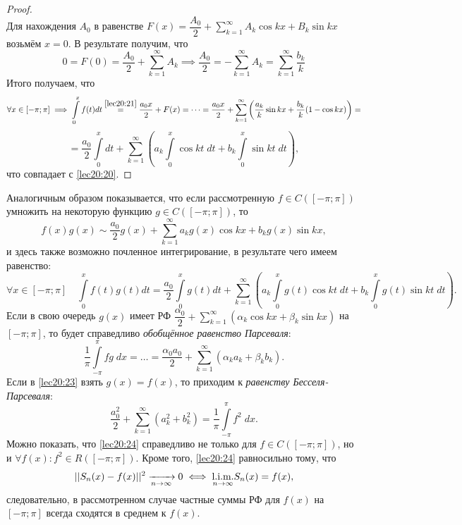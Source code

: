 \documentclass[../../main.tex]{subfiles}
\begin{document}
\begin{proof}
\[		\]
		Для нахождения $ A_0 $ в равенстве $ F(x) =
		\dfrac{A_0}{2} + \sum\limits_{k = 1}^\infty A_k\cos kx +
		B_k\sin kx $ возьмём $ x = 0 $. В результате получим, что
		\[
		0 = F(0) = \dfrac{A_0}{2} + \sum\limits_{k = 1}^\infty A_k \implies
		\dfrac{A_0}{2} = -\sum\limits_{k = 1}^\infty A_k = 
		\sum\limits_{k = 1}^\infty \dfrac{b_k}{k}
		\]
		Итого получаем, что 
		\[
		\forall x \in [-\pi; \pi] \implies
		\int\limits_0^x f(t) dt 
		\stackrel{\eqref{lec20:21}}{=}
		\dfrac{a_0x}{2} + F(x) = \dots = \dfrac{a_0x}{2} + 
		\sum\limits_{k = 1}^\infty \left(
		\dfrac{a_k}{k} \sin kx + \dfrac{b_k}{k} (1 - \cos kx)
		\right) = \] \[= \dfrac{a_0}{2} \int\limits_0^x dt +
		\sum\limits_{k = 1}^\infty \left(a_k \int\limits_0^x \cos kt\;dt +
		b_k \int\limits_0^x \sin kt\;dt\right),
		\]
		что совпадает с \eqref{lec20:20}.
	\end{proof}
	\begin{rem}
		Аналогичным образом показывается, что если рассмотренную
		$ f \in C([-\pi; \pi]) $ умножить на некоторую функцию
		$ g \in C([-\pi; \pi]) $, то \[f(x)g(x) \sim 
		\dfrac{a_0}{2}g(x) + \sum\limits_{k = 1}^\infty
		a_kg(x)\cos kx + b_kg(x)\sin kx,\] и здесь также возможно
		почленное интегрирование, в результате чего имеем равенство:
		\[
		\forall x \in [-\pi; \pi]\quad
		\int\limits_0^x f(t)g(t) dt = \dfrac{a_0}{2} 
		\int\limits_0^x g(t) dt + \sum\limits_{k = 1}^\infty
		\left(
		a_k\int\limits_0^xg(t)\cos kt\;dt + 
		b_k\int\limits_0^xg(t)\sin kt\;dt
		\right).
		\]
		Если в свою очередь $ g(x) $ имеет РФ $ 
		\dfrac{\alpha_0}{2} + \sum\limits_{k = 1}^\infty 
		(\alpha_k\cos kx + \beta_k\sin kx)$ на $ [-\pi; \pi] $, 
		то будет справедливо \emph{обобщённое равенство Парсеваля}:
		\begin{equation}
		\label{lec20:23}
			\dfrac{1}{\pi} \int\limits_{-\pi}^\pi fg\;dx =
			\dots = \dfrac{\alpha_0a_0}{2} +
			\sum\limits_{k = 1}^\infty(\alpha_ka_k + \beta_kb_k).
		\end{equation}
		Если в \eqref{lec20:23} взять $ g(x) = f(x) $, 
		то приходим к \emph{равенству Бесселя-Парсеваля}:
		\begin{equation}
		\label{lec20:24}
			\dfrac{a_0^2}{2} + \sum\limits_{k = 1}^\infty(a_k^2 + b_k^2) =
			\dfrac{1}{\pi} \int\limits_{-\pi}^\pi f^2\;dx.
		\end{equation}
		Можно показать, что \eqref{lec20:24} справедливо не только для 
		$ f \in C([-\pi; \pi]) $, но и $ \forall f(x):
		{f^2 \in R([-\pi; \pi])}$. 
		Кроме того, \eqref{lec20:24} равносильно тому, что
		\[
		||S_n(x) - f(x)||^2 \xrightarrow[n \to \infty]{} 0
		\iff \underset{n \to \infty}{\text{l.i.m.}} S_n(x) = f(x),
		\]
		следовательно, в рассмотренном случае частные суммы РФ для 
		$ f(x) $ на $ [-\pi; \pi] $ всегда сходятся в среднем к $ f(x) $.
	\end{rem}
\end{document}
